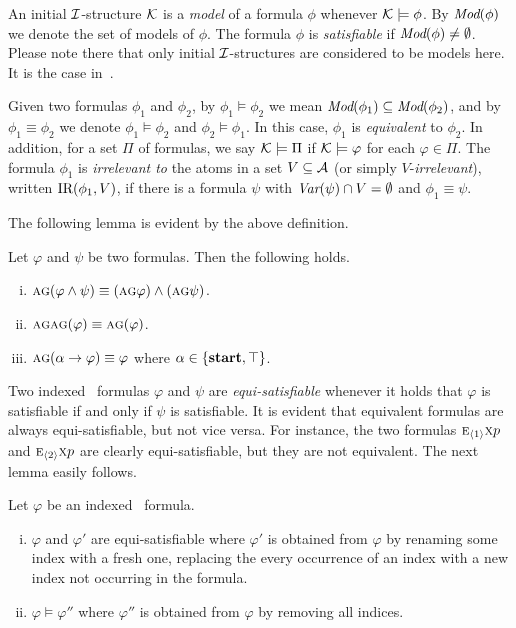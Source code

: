 \documentclass[twoside,11pt]{article}
\begin{document}
An initial ${\cal I}$-structure $\cal K$ is a {\em model} of a formula $\phi$
whenever ${\cal K}\models\phi$.
By $\textit{Mod}(\phi)$ we denote the set of models of $\phi$.
The formula $\phi$  is {\em satisfiable} if $\textit{Mod}(\phi)\neq\emptyset$.
Please note there that
only initial ${\cal I}$-structures are considered to be models here. It is the case in~\cite{browne1988characterizing,Bolotov:1999:JETAI,zhang2014resolution}.



Given two formulas $\phi_1$ and $\phi_2$,  by $\phi_1\models\phi_2$ we mean $\textit{Mod}(\phi_1)\subseteq\textit{Mod}(\phi_2)$, and by $\phi_1\equiv\phi_2$ we denote $\phi_1\models\phi_2$ and $\phi_2\models\phi_1$.
In this case, $\phi_1$ is {\em equivalent} to $\phi_2$.
In addition, for a set $\Pi$ of formulas, we say ${\cal K} \models \Pi$ if ${\cal K} \models \varphi$ for each $\varphi \in \Pi$.
The formula $\phi_1$ is {\em irrelevant to} the atoms in a set $V\subseteq\cal A$ (or simply $V$-{\em irrelevant}), written $\textrm{IR}(\phi_1,V)$, if there is a formula $\psi$ with
$\textit{Var}(\psi)\cap V=\emptyset$ and $\phi_1\equiv\psi$.

The following lemma is evident by the above definition.
\begin{lemma}
  Let $\varphi$ and $\psi$ be two formulas. Then the following holds.
  \begin{enumerate}[(i)]
    \item $\textsc{a}\textsc{g} (\varphi\land\psi)\equiv (\textsc{a}\textsc{g} \varphi) \land (\textsc{a}\textsc{g}\psi)$.
    \item $\textsc{a}\textsc{g} \textsc{a}\textsc{g} (\varphi)\equiv \textsc{a}\textsc{g} (\varphi)$.
    \item $\textsc{a}\textsc{g} (\alpha\rightarrow\varphi)\equiv \varphi$ where $\alpha\in\{\textbf{start},\top\}$.
  \end{enumerate}
\end{lemma}

Two indexed \CTL\ formulas $\varphi$ and $\psi$ are {\em equi-satisfiable} whenever it holds that
$\varphi$ is satisfiable if and only if $\psi$ is satisfiable. It is evident that equivalent formulas
are always equi-satisfiable, but not vice versa. For instance, the two formulas $\textsc{e}_{{\langle{1}\rangle}}\textsc{x} p$
and $\textsc{e}_{{\langle{2}\rangle}}\textsc{x} p$ are clearly equi-satisfiable, but they are not equivalent.
%
The next lemma easily follows. %
\begin{lemma}
  Let $\varphi$ be an indexed \CTL\ formula.
  \begin{enumerate}[(i)]
    \item $\varphi$ and $\varphi'$ are equi-satisfiable where $\varphi'$ is obtained from $\varphi$ by renaming some index
    with a fresh one, \ie replacing the every occurrence of an index with a new index not occurring in the formula.
    \item $\varphi\models\varphi''$ where $\varphi''$ is obtained from $\varphi$ by removing all indices.
  \end{enumerate}
\end{lemma}
\end{document}
